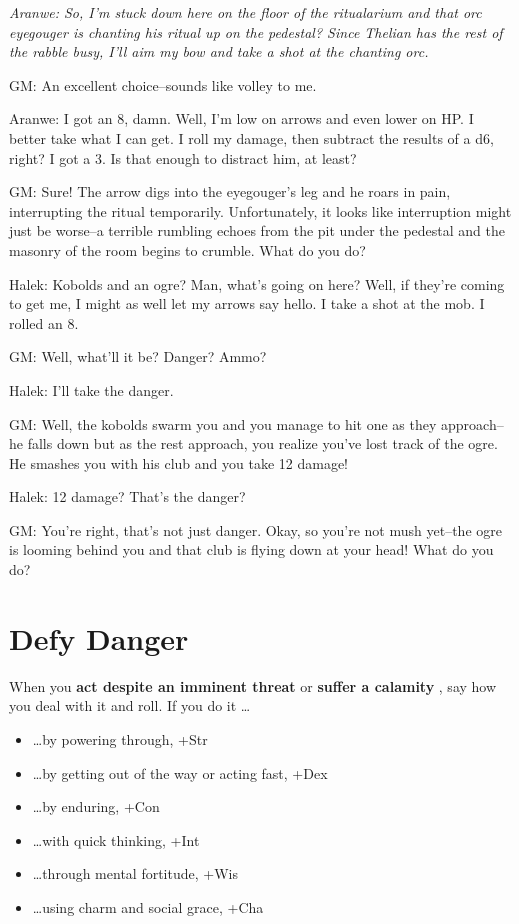 {\itshape
Aranwe: So, I'm stuck down here on the floor of the ritualarium and that orc eyegouger is chanting his ritual up on the pedestal? Since Thelian has the rest of the rabble busy, I'll aim my bow and take a shot at the chanting orc.

GM: An excellent choice--sounds like volley to me.

Aranwe: I got an 8, damn. Well, I'm low on arrows and even lower on HP\@. I better take what I can get. I roll my damage, then subtract the results of a d6, right? I got a 3. Is that enough to distract him, at least?

GM: Sure! The arrow digs into the eyegouger's leg and he roars in pain, interrupting the ritual temporarily. Unfortunately, it looks like interruption might just be worse--a terrible rumbling echoes from the pit under the pedestal and the masonry of the room begins to crumble. What do you do?

Halek: Kobolds and an ogre? Man, what's going on here? Well, if they're coming to get me, I might as well let my arrows say hello. I take a shot at the mob. I rolled an 8.

GM: Well, what'll it be? Danger? Ammo?

Halek: I'll take the danger.

GM: Well, the kobolds swarm you and you manage to hit one as they approach--he falls down but as the rest approach, you realize you've lost track of the ogre. He smashes you with his club and you take 12 damage!

Halek: 12 damage? That's the danger?

GM: You're right, that's not just danger. Okay, so you're not mush yet--the ogre is looming behind you and that club is flying down at your head! What do you do?
}
\section*{Defy Danger}
\HRule
When you \textbf{act despite an imminent threat}
or \textbf{suffer a calamity}
, say how you deal with it and roll. If you do it \ldots 
\begin{itemize}
\item  \ldots by powering through, +Str
\item  \ldots by getting out of the way or acting fast, +Dex
\item  \ldots by enduring, +Con
\item  \ldots with quick thinking, +Int
\item  \ldots through mental fortitude, +Wis
\item  \ldots using charm and social grace, +Cha
\end{itemize}
\HRule

